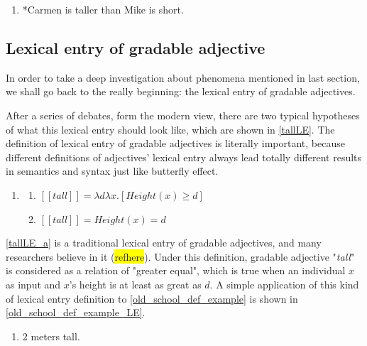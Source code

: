 \documentclass{ctexart}
\begin{document}
\begin{enumerate}[resume]
\item \label{ref5}
*Carmen is taller than Mike is short.
\end{enumerate}

\subsection{Lexical entry of gradable adjective}

In order to take a deep investigation about phenomena mentioned in last section, we shall go back to the really beginning: the lexical entry of gradable adjectives. 

After a series of debates, form the modern view, there are two typical hypotheses of what this lexical entry should look like, which are shown in \ref{tallLE}. The definition of lexical entry of gradable adjectives is literally important, because different definitions of adjectives' lexical entry always lead totally different results in semantics and syntax just like butterfly effect.

\begin{enumerate}[resume]
    \item \label{tallLE}
    
    \begin{enumerate}[ref=(\arabic{enumi}\alph*)]
        \item \label{tallLE_a} 
        $[\![tall]\!]=\lambda d \lambda x.[Height(x) \geq d]$
    
        \item \label{tallLE_b} 
        $[\![tall]\!]=Height(x)=d$
    
    \end{enumerate}
\end{enumerate}

\ref{tallLE_a} is a traditional lexical entry of gradable adjectives, and many researchers believe in it (\colorbox{yellow}{refhere}). Under this definition, gradable adjective "\textit{tall}" is considered as a relation of "greater equal", which is true when an individual $x$ as input and $x$'s height is at least as great as $d$. A simple application of this kind of lexical entry definition to \ref{old_school_def_example} is shown in \ref{old_school_def_example_LE}.

\begin{enumerate}[resume]

    \item \label{old_school_def_example} 2 meters tall.

\end{enumerate}
\end{document}
